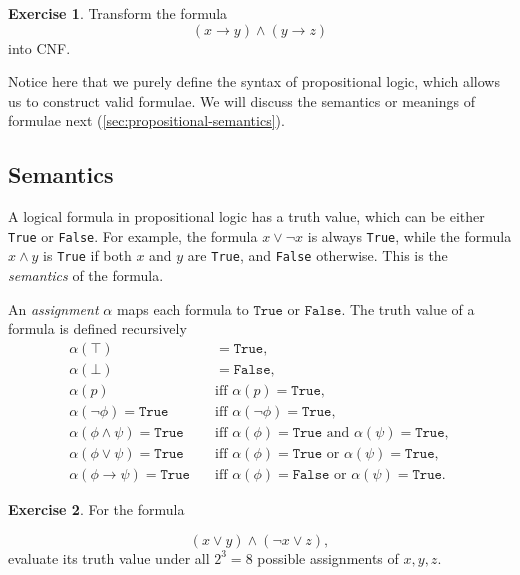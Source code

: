 \documentclass[oneside,11pt,dvipsnames]{book}
\numberwithin{equation}{section}
\theoremstyle{definition}
\newtheorem{exercise}{Exercise}[section]
\theoremstyle{remark}
\newenvironment{commentbox}[1][]{
  \small
  \begin{mybox}
    {\small \textbf{#1}}
  }{
  \end{mybox}
}
\begin{document}
\begin{exercise}
Transform the formula 
\[
(x \to y) \land (y \to z)
\]
into CNF.
\end{exercise}


\begin{commentbox}
Notice here that we purely define the syntax of propositional logic, which allows us to construct valid formulae. We will discuss the semantics or meanings of formulae next (\autoref{sec:propositional-semantics}).
\end{commentbox}
\subsection{Semantics}\label{sec:propositional-semantics}

A logical formula in propositional logic has a truth value, which can be either \texttt{True} or \texttt{False}. 
For example, the formula $x \lor \neg{x}$ is always \texttt{True}, while the formula $x \land y$ is \texttt{True} if both $x$ and $y$ are \texttt{True}, and \texttt{False} otherwise.
This is the \emph{semantics} of the formula.

An \emph{assignment} $\alpha$ maps each formula to $\texttt{True}$ or $\texttt{False}$.
The truth value of a formula is defined recursively
\begin{align*}
  \alpha(\top) &\quad = \texttt{True}, \\
  \alpha(\bot) &\quad = \texttt{False}, \\
  \alpha(p) &\quad \text{iff } \alpha(p) = \texttt{True}, \\
  \alpha(\lnot \phi) = \texttt{True} &\quad \text{iff } \alpha(\lnot \phi) = \texttt{True}, \\
  \alpha(\phi \land \psi) = \texttt{True} &\quad \text{iff } \alpha(\phi) = \texttt{True} \text{ and } \alpha(\psi) = \texttt{True}, \\
  \alpha(\phi \lor \psi) = \texttt{True} &\quad \text{iff } \alpha(\phi) = \texttt{True} \text{ or } \alpha(\psi) = \texttt{True}, \\
  \alpha(\phi \to \psi) = \texttt{True} &\quad \text{iff } \alpha(\phi) = \texttt{False} \text{ or } \alpha(\psi) = \texttt{True}.
\end{align*}

\begin{exercise}  
For the formula 

\[
(x \lor y) \land (\lnot x \lor z), 
\]
evaluate its truth value under all $2^3=8$ possible assignments of $x,y,z$.
\end{exercise}
\end{document}
